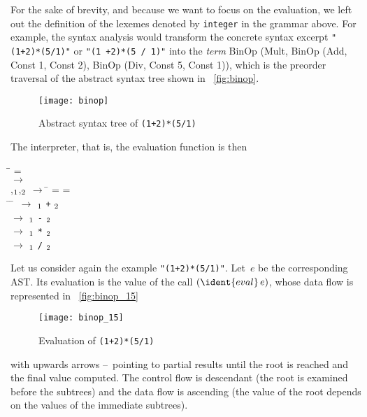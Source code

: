 For the sake of brevity, and because we want to focus on the
evaluation, we left out the definition of the lexemes denoted by
\texttt{integer} in the grammar above. For example, the syntax
analysis would transform the concrete syntax excerpt
\texttt{"(1+2)*(5/1)"} or \texttt{"(1 +2)*(5 / 1)"} into the
\emph{term} \textsf{BinOp (Mult, BinOp (Add, Const 1, Const 2), BinOp
  (Div, Const 5, Const 1))}, which is the preorder traversal of the
abstract syntax tree shown in \fig~\vref{fig:binop}.
\begin{figure}[b]
\centering
\texttt{[image: binop]}
\caption{Abstract syntax tree of \texttt{(1+2)*(5/1)}
\label{fig:binop}}
\end{figure}

The interpreter, that is, the evaluation function
is then
\begin{tabbing}
\Xlet \= \Xrec \=   = \Xmatch
  \Xwith\\
 \>   \(\rightarrow\) \\
 \vbar \> 
 \lpar{},\(\sb{1}\),\(\sb{2}\)\rpar{}
 \(\rightarrow\) \= \Xlet {} = 
 \Xand  {} = \\
 \> \> \Xin \= \Xmatch {} \Xwith \= \;\,  \(\rightarrow\)
 \(\sb{1}\) \texttt{+} \(\sb{2}\)\\
 \> \> \> \> \vbar  {} \(\rightarrow\)
 \(\sb{1}\) \texttt{-} \(\sb{2}\)\\
 \> \> \> \> \vbar {} \(\rightarrow\)
 \(\sb{1}\) \texttt{*} \(\sb{2}\)\\
 \> \> \> \> \vbar {} \(\rightarrow\)
 \(\sb{1}\) \texttt{/} \(\sb{2}\)
\end{tabbing}
Let us consider again the example \texttt{"(1+2)*(5/1)"}. Let~$e$ be
the corresponding AST. Its evaluation is the value of the call
$(\ident{eval} \, e)$, whose data flow is represented in
\fig~\vref{fig:binop_15}
\begin{figure}
\centering
\texttt{[image: binop\_15]}
\caption{Evaluation of \texttt{(1+2)*(5/1)}
\label{fig:binop_15}}
\end{figure}
with upwards arrows --~pointing to partial results until the root is
reached and the final value computed. The control flow is descendant
(the root is examined before the subtrees) and the data flow is
ascending (the value of the root depends on the values of the
immediate subtrees).

